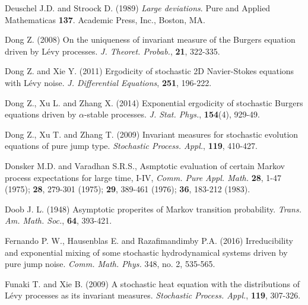 \documentclass[12pt,a4paper]{article}
\theoremstyle{definition}
\theoremstyle{remark}
\numberwithin{equation}{section}
\begin{document}
{\begin{thebibliography}{99}
 Deuschel J.D. and Stroock D. (1989) \textit{Large deviations}.  Pure and Applied Mathematicas \textbf{137}. Academic Press, Inc., Boston, MA.

 Dong Z. (2008) On the uniqueness of invariant measure of the Burgers equation  driven by L\'evy processes. \textit{J. Theoret. Probab.}, \textbf{21},  322-335.

Dong Z. and Xie Y. (2011) Ergodicity of stochastic 2{D}  {N}avier-{S}tokes equations with {L}\'evy noise.  \textit{J.  Differential Equations},  \textbf{251},  196-222.


Dong Z., Xu L. and  Zhang X. (2014)  Exponential ergodicity of stochastic Burgers equations driven by $\alpha$-stable processes.  \textit{J. Stat. Phys.}, \textbf{154}(4), 929-49.

Dong Z., Xu T. and  Zhang T. (2009) Invariant measures for  stochastic evolution equations of pure jump type. \textit{Stochastic Process. Appl.},  \textbf{119},  410-427.


 Donsker M.D.  and   Varadhan S.R.S.,   Asmptotic evaluation of certain Markov process expectations for large time, I-IV,
{\it Comm. Pure Appl. Math.} \textbf{28}, 1-47  (1975); \textbf{28}, 279-301  (1975); \textbf{29}, 389-461  (1976); \textbf{36}, 183-212  (1983).


 Doob J. L. (1948) Asymptotic properites of Markov transition probability. \textit{Trans. Am. Math. Soc.}, \textbf{64}, 393-421.





 Fernando P. W., Hausenblas E. and Razafimandimby P.A. (2016) Irreducibility and exponential mixing of some stochastic hydrodynamical systems driven by pure jump noise. \textit{Comm. Math. Phys.} 348, no. 2, 535-565.

 Funaki T. and Xie B. (2009) A stochastic heat equation with
the distributions of {L}\'evy processes as its invariant measures.
\textit{Stochastic Process. Appl.}, \textbf{119},  307-326.




\end{thebibliography}}
\end{document}

